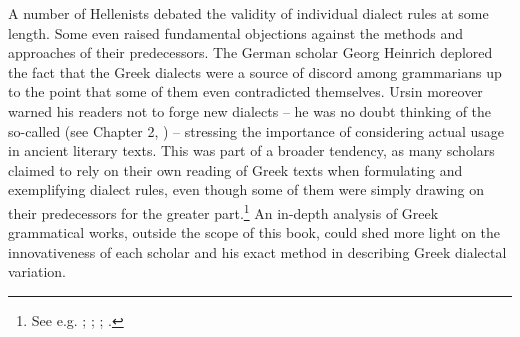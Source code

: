 A number of Hellenists debated the validity of individual dialect rules at some length. Some even raised fundamental objections against the methods and approaches of their predecessors. The German scholar Georg Heinrich \citet[512]{Ursin1691} deplored the fact that the Greek dialects were a source of discord among grammarians up to the point that some of them even contradicted themselves. Ursin moreover warned his readers not to forge new dialects – he was no doubt thinking of the so-called  (see Chapter 2, ) – stressing the importance of considering actual usage in ancient literary texts. This was part of a broader tendency, as many scholars claimed to rely on their own reading of Greek texts when formulating and exemplifying dialect rules, even though some of them were simply drawing on their predecessors for the greater part.\footnote{{See e.g. \citet[†.7\textsc{\textsuperscript{r}}]{Walper1589}; \citet[{\footnotesize{)(}}.4\textsc{\textsuperscript{r}}]{Portus1603}; \citet[5\textsc{\textsuperscript{[a]}}]{Merigon1621}; \citet[b.4\textsc{\textsuperscript{v}}–b.5\textsc{\textsuperscript{r}}, 432]{Nibbe1725}.}}  An in-depth analysis of Greek grammatical works, outside the scope of this book, could shed more light on the innovativeness of each scholar and his exact method in describing Greek dialectal variation.

